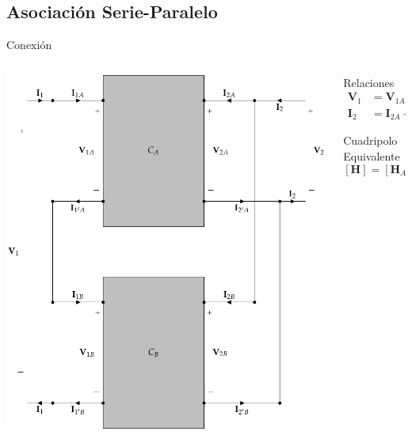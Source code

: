 \documentclass[aspectratio=169, usenames,svgnames,dvipsnames]{beamer}
\begin{document}
\subsection{Asociación Serie-Paralelo}
\label{sec:org9e372d2}
\begin{frame}[label={sec:org9827001}]{Conexión}
\begin{columns}
\begin{column}{0.5\columnwidth}
\begin{center}
\includegraphics[height=0.75\textheight]{../figs/serie-paralelo.pdf}
\end{center}
\end{column}
\begin{column}{0.5\columnwidth}
\begin{block}{Relaciones}
\begin{align*}
  \mathbf{V}_1 &= \mathbf{V}_{1A} + \mathbf{V}_{1B}\\
  \mathbf{I}_2 &= \mathbf{I}_{2A} + \mathbf{I}_{2B}
\end{align*}
\end{block}

\begin{block}{Cuadripolo Equivalente}
\[
  \boxed{[\mathbf{H}] = [\mathbf{H}_A] + [\mathbf{H}_B]}
\]
\end{block}
\end{column}
\end{columns}
\end{frame}
\end{document}
